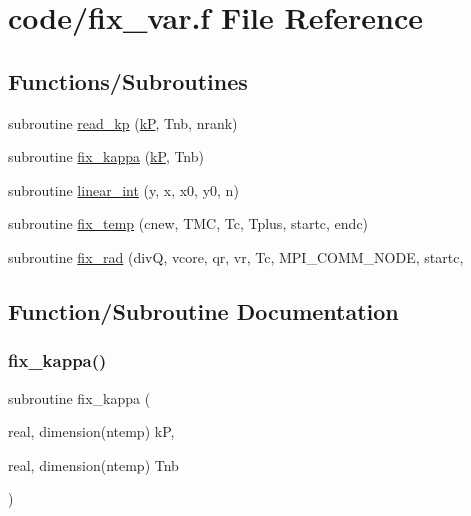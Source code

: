 \hypertarget{fix__var_8f}{}\section{code/fix\+\_\+var.f File Reference}
\label{fix__var_8f}
\subsection*{Functions/\+Subroutines}
\begin{DoxyCompactItemize}
\item 
subroutine \hyperlink{fix__var_8f_af4aa948d8d18b1b8319b5c6abc736162}{read\+\_\+kp} (\hyperlink{mc__gpu_8cu_ace3a0d571ca64447b29bc9999d23b85e}{kP}, Tnb, nrank)
\item 
subroutine \hyperlink{fix__var_8f_a81dd39b05aed1d1fff12dfef301189a6}{fix\+\_\+kappa} (\hyperlink{mc__gpu_8cu_ace3a0d571ca64447b29bc9999d23b85e}{kP}, Tnb)
\item 
subroutine \hyperlink{fix__var_8f_a1ab3da80be3f3ec186d62448e97fb109}{linear\+\_\+int} (y, x, x0, y0, n)
\item 
subroutine \hyperlink{fix__var_8f_a361fadb6169e81f1c82345e5a3ce16a6}{fix\+\_\+temp} (cnew, T\+MC, Tc, Tplus, startc, endc)
\item 
subroutine \hyperlink{fix__var_8f_a5378a292df9beea36067a2558a342a0d}{fix\+\_\+rad} (divQ, vcore, qr, vr, Tc, M\+P\+I\+\_\+\+C\+O\+M\+M\+\_\+\+N\+O\+DE, startc,
\end{DoxyCompactItemize}


\subsection{Function/\+Subroutine Documentation}
\mbox{\label{fix__var_8f_a81dd39b05aed1d1fff12dfef301189a6}} 
\subsubsection{\texorpdfstring{fix\+\_\+kappa()}{fix\_kappa()}}
{\footnotesize\ttfamily subroutine fix\+\_\+kappa (\begin{DoxyParamCaption}\item[{real, dimension(ntemp)}]{kP,  }\item[{real, dimension(ntemp)}]{Tnb }\end{DoxyParamCaption})}

